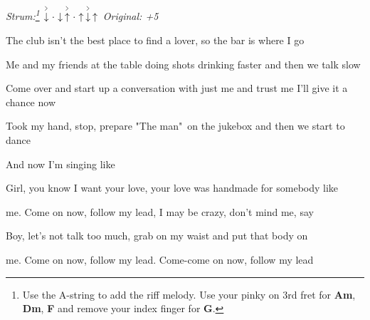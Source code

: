 \begin{song}


\begin{headerbox}
\textit{Strum:\footnote{
Use the A-string to add the riff melody. Use your pinky on 3rd fret for
\textbf{Am}, \textbf{Dm}, \textbf{F} and remove your index finger for \textbf{G}.
}} $\AccentDown\Miss\Down\AccentUp\Miss\Up\AccentDown\Up$ \quad
\textit{Original: +5} \par
\end{headerbox}

\begin{hchordbox}
\end{hchordbox}

\normalsize

\bigskip

The club isn't the best place to find a lover, so the bar is where I go \par
{}Me and my friends at the table doing shots drinking faster and then we talk slow \par
Come over and start up a conversation with just me and trust me I'll give it a chance now \par
Took my hand, stop, prepare "The man"\ on the jukebox and then we start to dance \par
And now I'm singing like \par

\bigskip

\begin{chorusbox}{\PrechorusAndChorus} \par
{}Girl, you know I want your love, your love was handmade for somebody like \par
{}me. Come on now, follow my lead, I may be crazy, don't mind me, say \par
{}Boy, let's not talk too much, grab on my waist and put that body on \par
{}me. Come on now, follow my lead. Come-come on now, follow my lead \par

\bigskip


\end{chorusbox}
\end{song}

